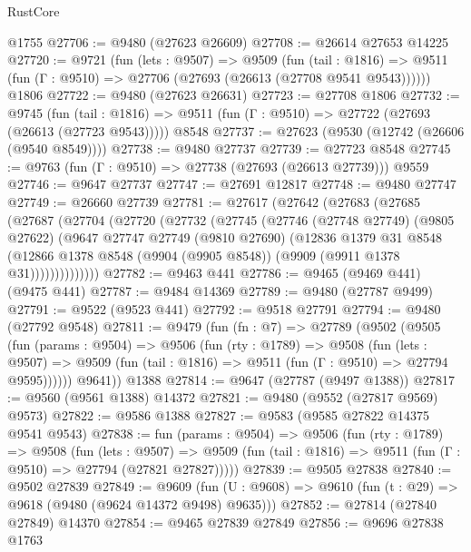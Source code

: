\begin{lexlean}{RustCore}
\begin{coremodule}
    @1755
@27706 := @9480 (@27623 @26609)
@27708 := @26614 @27653 @14225
@27720 := @9721
    (fun (lets : @9507) =>
    @9509
      (fun (tail : @1816) =>
      @9511 (fun (Γ : @9510) => @27706 (@27693 (@26613 (@27708 @9541 @9543))))))
    @1806
@27722 := @9480 (@27623 @26631)
@27723 := @27708 @1806
@27732 := @9745
    (fun (tail : @1816) => @9511 (fun (Γ : @9510) => @27722 (@27693 (@26613 (@27723 @9543)))))
    @8548
@27737 := @27623 (@9530 (@12742 (@26606 (@9540 @8549))))
@27738 := @9480 @27737
@27739 := @27723 @8548
@27745 := @9763 (fun (Γ : @9510) => @27738 (@27693 (@26613 @27739))) @9559
@27746 := @9647 @27737
@27747 := @27691 @12817
@27748 := @9480 @27747
@27749 := @26660 @27739
@27781 := @27617
    (@27642
      (@27683
        (@27685
          (@27687
            (@27704
              (@27720
                (@27732
                  (@27745
                    (@27746
                      (@27748 @27749)
                      (@9805 @27622)
                      (@9647
                        @27747
                        @27749
                        (@9810 @27690)
                        (@12836
                          @1379
                          @31
                          @8548
                          (@12866
                            @1378
                            @8548
                            (@9904 (@9905 @8548))
                            (@9909 (@9911 @1378 @31))))))))))))))
@27782 := @9463 @441
@27786 := @9465 (@9469 @441) (@9475 @441)
@27787 := @9484 @14369
@27789 := @9480 (@27787 @9499)
@27791 := @9522 (@9523 @441)
@27792 := @9518 @27791
@27794 := @9480 (@27792 @9548)
@27811 := @9479
    (fun (fn : @7) =>
    @27789
      (@9502
        (@9505
          (fun (params : @9504) =>
          @9506
            (fun (rty : @1789) =>
            @9508
              (fun (lets : @9507) =>
              @9509 (fun (tail : @1816) => @9511 (fun (Γ : @9510) => @27794 @9595))))))
        @9641))
    @1388
@27814 := @9647 (@27787 (@9497 @1388))
@27817 := @9560 (@9561 @1388) @14372
@27821 := @9480 (@9552 (@27817 @9569) @9573)
@27822 := @9586 @1388
@27827 := @9583 (@9585 @27822 @14375 @9541 @9543)
@27838 := fun (params : @9504) =>
  @9506
    (fun (rty : @1789) =>
    @9508
      (fun (lets : @9507) =>
      @9509 (fun (tail : @1816) => @9511 (fun (Γ : @9510) => @27794 (@27821 @27827)))))
@27839 := @9505 @27838
@27840 := @9502 @27839
@27849 := @9609
    (fun (U : @9608) => @9610 (fun (t : @29) => @9618 (@9480 (@9624 @14372 @9498) @9635)))
@27852 := @27814 (@27840 @27849) @14370
@27854 := @9465 @27839 @27849
@27856 := @9696 @27838 @1763

\end{coremodule}
\end{lexlean}
